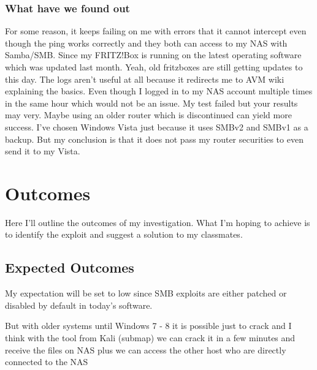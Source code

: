 \documentclass[12pt, letterpaper]{article}
\begin{document}
\newpage

\subsubsection{What have we found out}
For some reason, it keeps failing on me with errors that it cannot intercept even though the ping works correctly and they both can access to my NAS with Samba/SMB. Since my FRITZ!Box is running on the latest operating software which was updated last month. Yeah, old fritzboxes are still getting updates to this day. The logs aren't useful at all because it redirects me to AVM wiki explaining the basics. Even though I logged in to my NAS account multiple times in the same hour which would not be an issue. My test failed but your results may very. Maybe using an older router which is discontinued can yield more success. I've chosen Windows Vista just because it uses SMBv2 and SMBv1 as a backup. But my conclusion is that it does not pass my router securities to even send it to my Vista.
\newpage

\section{Outcomes}
Here I'll outline the outcomes of my investigation. What I'm hoping to achieve is to identify the exploit and suggest a solution to my classmates.

\subsection{Expected Outcomes}
My expectation will be set to low since SMB exploits are either patched or disabled by default in today's software.

But with older systems until Windows 7 - 8 it is possible just to crack and I think with the tool from Kali (submap) we can crack it in a few minutes and receive the files on NAS plus we can access the other host who are directly connected to the NAS
\end{document}
